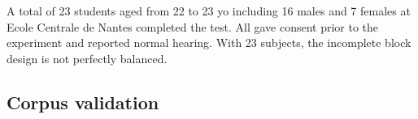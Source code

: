 \documentclass[11pt,a4paper]{article}
\begin{document}
A total of 23 students aged from 22 to 23 yo including 16 males and 7 females at Ecole Centrale de Nantes completed the test. All gave consent prior to the experiment and reported normal hearing. With 23 subjects, the incomplete block design is not perfectly balanced.

\subsection{Corpus validation}
\label{sec:data_val}

%
\end{document}
